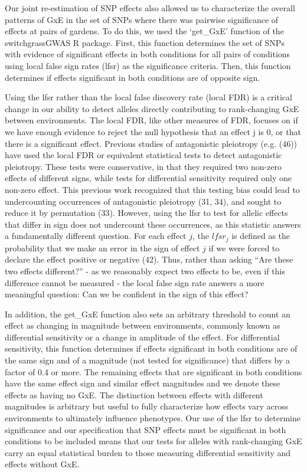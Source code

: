 \documentclass[
  9pt,
  twocolumn,
  twoside]{pnas-new}
\begin{document}
Our joint re-estimation of SNP effects also allowed us to characterize
the overall patterns of GxE in the set of SNPs where there was pairwise
significance of effects at pairs of gardens. To do this, we used the
`get\_GxE' function of the switchgrassGWAS R package. First, this
function determines the set of SNPs with evidence of significant effects
in both conditions for all pairs of conditions using local false sign
rates (lfsr) as the significance criteria. Then, this function
determines if effects significant in both conditions are of opposite
sign.

Using the lfsr rather than the local false discovery rate (local FDR) is
a critical change in our ability to detect alleles directly contributing
to rank-changing GxE between environments. The local FDR, like other
measures of FDR, focuses on if we have enough evidence to reject the
null hypothesis that an effect j is 0, or that there is a significant
effect. Previous studies of antagonistic pleiotropy (e.g. (46)) have
used the local FDR or equivalent statistical tests to detect
antagonistic pleiotropy. These tests were conservative, in that they
required two non-zero effects of different signs, while tests for
differential sensitivity required only one non-zero effect. This
previous work recognized that this testing bias could lead to
undercounting occurrences of antagonistic pleiotropy (31, 34), and
sought to reduce it by permutation (33). However, using the lfsr to test
for allelic effects that differ in sign does not undercount these
occurrences, as this statistic answers a fundamentally different
question. For each effect \(j\), the \(lfsr_j\) is defined as the
probability that we make an error in the sign of effect \(j\) if we were
forced to declare the effect positive or negative (42). Thus, rather
than asking ``Are these two effects different?'' - as we reasonably
expect two effects to be, even if this difference cannot be measured -
the local false sign rate answers a more meaningful question: Can we be
confident in the sign of this effect?

In addition, the get\_GxE function also sets an arbitrary threshold to
count an effect as changing in magnitude between environments, commonly
known as differential sensitivity or a change in amplitude of the
effect. For differential sensitivity, this function determines if
effects significant in both conditions are of the same sign and of a
magnitude (not tested for significance) that differs by a factor of 0.4
or more. The remaining effects that are significant in both conditions
have the same effect sign and similar effect magnitudes and we denote
these effects as having no GxE. The distinction between effects with
different magnitudes is arbitrary but useful to fully characterize how
effects vary across environments to ultimately influence phenotypes. Our
use of the lfsr to determine significance and our specification that SNP
effects must be significant in both conditions to be included means that
our tests for alleles with rank-changing GxE carry an equal statistical
burden to those measuring differential sensitivity and effects without
GxE.
\end{document}
